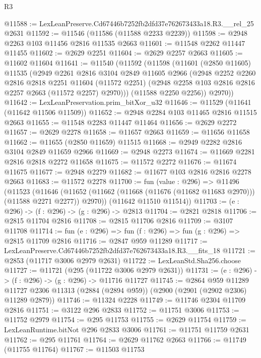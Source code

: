 \begin{lexlean}{R3}
\begin{coremodule}
@11588 := LexLeanPreserve.Cd67446b7252fb2dfd37e762673433a18.R3.__rel_25 @2631
@11592 := @11546 (@11586 (@11588 @2233 @2239))
@11598 := @2948 @2263 @103 @11456 @2816 @11535 @2663
@11601 := @11548 @2262 @11447 @11455
@11602 := @2629 @2251
@11604 := @2629 @2257 @2663
@11605 := @11602 @11604
@11641 := @11540
    (@11592
      (@11598
        (@11601
          (@2850 @11605)
          @11535
          (@2949
            @2261
            @2816
            @3104
            @2849
            @11605
            @2966
            (@2948
              @2252
              @2260
              @2816
              @2818
              @2251
              @11604
              (@11572 @2251)
              (@2948 @2258 @103 @2816 @2816 @2257 @2663 (@11572 @2257) @2970)))
          (@11588 @2250 @2256))
        @2970))
@11642 := LexLeanPreservation.prim_bitXor_u32
@11646 := @11529 (@11641 (@11642 @11506 @11509))
@11652 := @2948 @2284 @103 @11465 @2816 @11515 @2663
@11655 := @11548 @2283 @11447 @11464
@11656 := @2629 @2272
@11657 := @2629 @2278
@11658 := @11657 @2663
@11659 := @11656 @11658
@11662 := @11655 (@2850 @11659) @11515
@11668 := @2949 @2282 @2816 @3104 @2849 @11659 @2966
@11669 := @2948 @2273
@11674 := @11669 @2281 @2816 @2818 @2272 @11658
@11675 := @11572 @2272
@11676 := @11674 @11675
@11677 := @2948 @2279
@11682 := @11677 @103 @2816 @2816 @2278 @2663
@11683 := @11572 @2278
@11700 := fun (value : @296) =>
  @11496
    (@11523
      (@11646 (@11652 (@11662 (@11668 (@11676 (@11682 @11683 @2970))) (@11588 @2271 @2277)) @2970))
      (@11642 @11510 @11514))
@11703 := (e : @296) -> (f : @296) -> (g : @296) -> @2813
@11704 := @2821 @2818
@11706 := @2815 @11704 @2816
@11708 := @2815 @11706 @2816
@11709 := @3107 @11708
@11714 := fun (e : @296) => fun (f : @296) => fun (g : @296) => @2815 @11709 @2816
@11716 := @2847 @959 @11289
@11717 := LexLeanPreserve.Cd67446b7252fb2dfd37e762673433a18.R3.__fits_18
@11721 := @2853 (@11717 @3006 @2979 @2631)
@11722 := LexLeanStd.Sha256.choose
@11727 := @11721 (@295 (@11722 @3006 @2979 @2631))
@11731 := (e : @296) -> (f : @296) -> (g : @296) -> @11716 @11727
@11745 := @2864
    @959
    @11289
    @11727
    @2306
    @11313
    (@2884 (@2894 @959))
    (@2900 (@2901 (@2902 @2306) @11289 @2879))
@11746 := @11324 @2228
@11749 := @11746 @2304 @11709 @2816
@11751 := @3122 @296 @2833
@11752 := @11751 @3006
@11753 := @11752 @2979
@11754 := @295 @11753
@11755 := @2629 @11754
@11759 := LexLeanRuntime.bitNot @296 @2833 @3006
@11761 := @11751 @11759 @2631
@11762 := @295 @11761
@11764 := @2629 @11762 @2663
@11766 := @11749 (@11755 @11764)
@11767 := @11503 @11753

\end{coremodule}
\end{lexlean}
